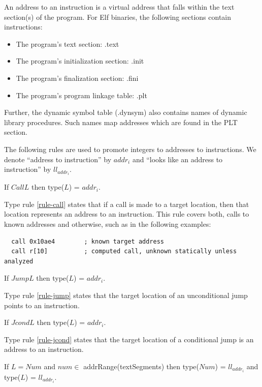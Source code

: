 An address to an instruction is a virtual address that falls 
within the text section(s) of the program.  For Elf binaries, the
following sections contain instructions: 
\begin{itemize}
\item The program's text section: .text
\item The program's initialization section: .init
\item The program's finalization section: .fini
\item The program's program linkage table: .plt
\end{itemize}
Further, the dynamic symbol table (.dynsym) also contains names of 
dynamic library procedures.  Such names map addresses which are 
found in the PLT section.

The following rules are used to promote integers to addresses to 
instructions.  We denote ``address to instruction'' by $addr_i$ 
and ``looks like an address to instruction'' by $ll_{addr_i}$.

\begin{typerule}
If $Call L$ then type($L$) = $addr_i$.
\label{rule-call}
\end{typerule}

Type rule \ref{rule-call} states that if a call is made to a target 
location, then that location represents an address to an instruction. 
This rule covers both, calls to known addresses and otherwise, 
such as in the following examples: 
\begin{verbatim}
  call 0x10ae4        ; known target address
  call r[10]          ; computed call, unknown statically unless analyzed
\end{verbatim}

\begin{typerule}
If $Jump L$ then type($L$) = $addr_i$.
\label{rule-jump}
\end{typerule}

Type rule \ref{rule-jump} states that the target location of an 
unconditional jump points to an instruction.

\begin{typerule}
If $Jcond L$ then type($L$) = $addr_i$.
\label{rule-jcond}
\end{typerule}

Type rule \ref{rule-jcond} states that the target location of a 
conditional jump is an address to an instruction.

\begin{typerule}
If $L = Num$ and $num \in$ addrRange(textSegments) then 
type($Num$) = $ll_{addr_i}$ and type($L$) = $ll_{addr_i}$.
\label{rule-textSeg}
\end{typerule}


